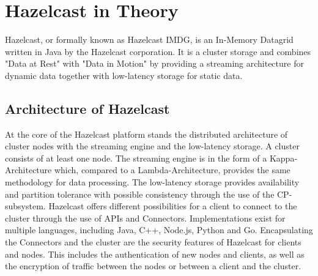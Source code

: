 
\section{Hazelcast in Theory}
Hazelcast, or formally known as Hazelcast IMDG, is an In-Memory Datagrid written in Java by the Hazelcast corporation. It is a cluster storage and combines "Data at Rest" with "Data in Motion" by providing a streaming architecture for dynamic data together with low-latency storage for static data.\parencite{HZintro} \parencite{hazelcast_what_2022}
\subsection{Architecture of Hazelcast}
At the core of the Hazelcast platform stands the distributed architecture of cluster nodes with the streaming engine and the low-latency storage. A cluster consists of at least one node. The streaming engine is in the form of a Kappa-Architecture which, compared to a Lambda-Architecture, provides the same methodology for data processing. The low-latency storage provides availability and partition tolerance with possible consistency through the use of the CP-subsystem. Hazelcast offers different possibilities for a client to connect to the cluster through the use of APIs and Connectors. Implementations exist for multiple languages, including Java, C++, Node.js, Python and Go.\parencite{hazelcast_what_2022} \parencite{HZclient}
Encapsulating the Connectors and the cluster are the security features of Hazelcast for clients and nodes. This includes the authentication of new nodes and clients, as well as the encryption of traffic between the nodes or between a client and the cluster.
